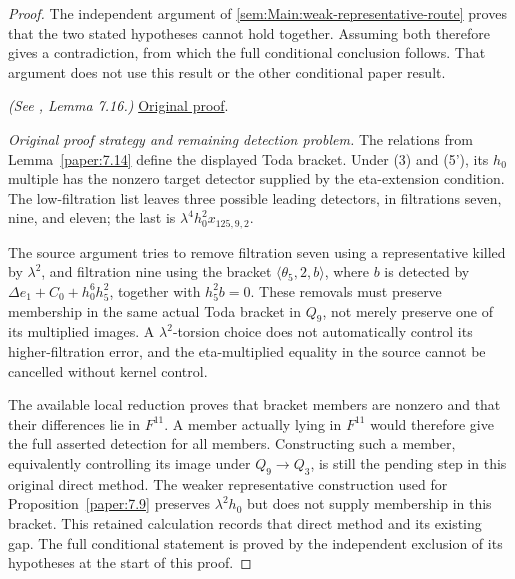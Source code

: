\begin{lemma}[Detection of the synthetic Toda bracket]
\end{lemma}
\begin{proof}
The independent argument of \ref{sem:Main:weak-representative-route} proves that the two stated hypotheses cannot hold together. Assuming both therefore gives a contradiction, from which the full conditional conclusion follows. That argument does not use this result or the other conditional paper result.

\textit{(See \cite{LWX126}, Lemma 7.16.)} \href{paper/main.tex.html#L2482}{Original proof}.

\textit{Original proof strategy and remaining detection problem.} The relations from Lemma~\ref{paper:7.14} define the displayed Toda bracket. Under (3) and (5'), its $h_0$ multiple has the nonzero target detector supplied by the eta-extension condition. The low-filtration list leaves three possible leading detectors, in filtrations seven, nine, and eleven; the last is $\lambda^4h_0^2x_{125,9,2}$.

The source argument tries to remove filtration seven using a representative killed by $\lambda^2$, and filtration nine using the bracket $\langle\theta_5,2,b\rangle$, where $b$ is detected by $\Delta e_1+C_0+h_0^6h_5^2$, together with $h_5^2b=0$. These removals must preserve membership in the same actual Toda bracket in $Q_9$, not merely preserve one of its multiplied images. A $\lambda^2$-torsion choice does not automatically control its higher-filtration error, and the eta-multiplied equality in the source cannot be cancelled without kernel control.

The available local reduction proves that bracket members are nonzero and that their differences lie in $F^{11}$. A member actually lying in $F^{11}$ would therefore give the full asserted detection for all members. Constructing such a member, equivalently controlling its image under $Q_9\to Q_3$, is still the pending step in this original direct method. The weaker representative construction used for Proposition~\ref{paper:7.9} preserves $\lambda^2h_0$ but does not supply membership in this bracket. This retained calculation records that direct method and its existing gap. The full conditional statement is proved by the independent exclusion of its hypotheses at the start of this proof.
\end{proof}

